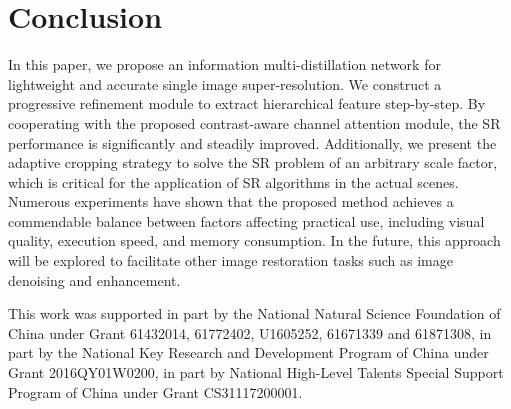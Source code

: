 \documentclass[sigconf]{acmart}
\begin{document}
\section{Conclusion}\label{sec:conclusion}
In this paper, we propose an information multi-distillation network for lightweight and accurate single image super-resolution. We construct a progressive refinement module to extract hierarchical feature step-by-step. By cooperating with the proposed contrast-aware channel attention module, the SR performance is significantly and steadily improved. Additionally, we present the adaptive cropping strategy to solve the SR problem of an arbitrary scale factor, which is critical for the application of SR algorithms in the actual scenes. Numerous experiments have shown that the proposed method achieves a commendable balance between factors affecting practical use, including visual quality, execution speed, and memory consumption. In the future, this approach will be explored to facilitate other image restoration tasks such as image denoising and enhancement.

\begin{acks}
	This work was supported in part by the National Natural Science Foundation of China under Grant 61432014, 61772402, U1605252, 61671339 and 61871308, in part by the National Key Research and Development Program of China under Grant 2016QY01W0200, in part by National High-Level Talents Special Support Program of China under Grant CS31117200001.
\end{acks}

\clearpage

\balance

\end{document}

